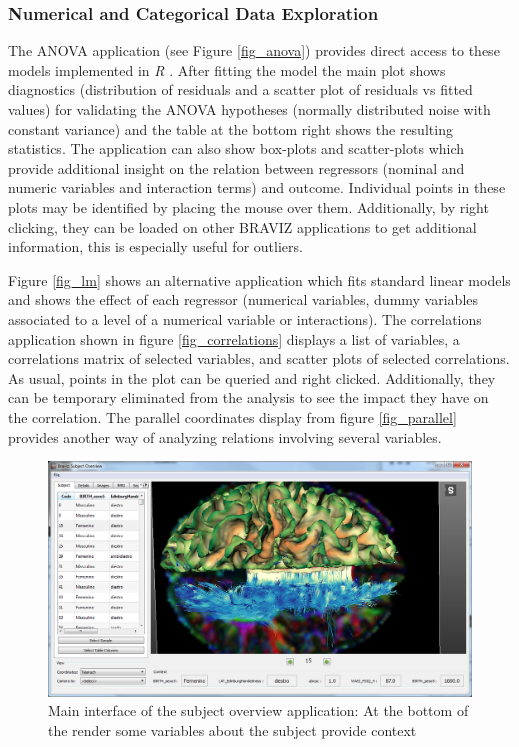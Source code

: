 \documentclass[twocolumn]{svjour3}
\begin{document}
\subsubsection{Numerical and Categorical Data Exploration}

The ANOVA application (see Figure \ref{fig_anova}) provides direct access to these models implemented in \emph{R} \cite{team_r:_2012}. After fitting the model the main plot shows diagnostics (distribution of residuals and a scatter plot of residuals vs fitted values) for validating the ANOVA hypotheses (normally distributed noise with constant variance) and the table at the bottom right shows the resulting statistics. The application can also show box-plots and scatter-plots which provide additional insight on the relation between regressors (nominal and numeric variables and interaction terms) and outcome. Individual points in these plots may be identified by placing the mouse over them. Additionally, by right clicking, they can be loaded on other BRAVIZ applications to get additional information, this is especially useful for outliers.

Figure \ref{fig_lm} shows an alternative application which fits standard linear models and shows the effect of each regressor (numerical variables, dummy variables associated to a level of a numerical variable or interactions). The correlations application shown in figure \ref{fig_correlations} displays a list of variables, a correlations matrix of selected variables, and scatter plots of selected correlations. As usual, points in the plot can be queried and right clicked. Additionally, they can be temporary eliminated from the analysis to see the impact they have on the correlation. The parallel coordinates display from figure \ref{fig_parallel} provides another way of analyzing relations involving several variables.

\begin{figure}
\begin{center}
\includegraphics[width=\linewidth]{subj_overview_full}
\end{center}
 \caption{\label{fig_subject}Main interface of the subject overview application: At the bottom of the render some variables about the subject provide context}
\end{figure}
\end{document}
